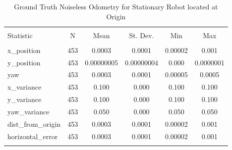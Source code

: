 
\begin{table}[h] \centering 
  \caption{Ground Truth Noiseless Odometry for Stationary Robot located at Origin} 
  \label{tab:gazebo_stationary_noiseless_summary} 
\begin{tabular}{@{\extracolsep{5pt}}lccccc} 
\\[-1.8ex]\hline 
\hline \\[-1.8ex] 
Statistic & \multicolumn{1}{c}{N} & \multicolumn{1}{c}{Mean} & \multicolumn{1}{c}{St. Dev.} & \multicolumn{1}{c}{Min} & \multicolumn{1}{c}{Max} \\ 
\hline \\[-1.8ex] 
x\_position & 453 & \num{0.0003} & \num{0.0001} & \num{0.00002} & \num{0.001} \\ 
y\_position & 453 & \num{0.00000005} & \num{0.00000004} & \num{0.000} & \num{0.0000001} \\ 
yaw & 453 & \num{0.0003} & \num{0.0001} & \num{0.00005} & \num{0.0005} \\ 
x\_variance & 453 & \num{0.100} & \num{0.000} & \num{0.100} & \num{0.100} \\ 
y\_variance & 453 & \num{0.100} & \num{0.000} & \num{0.100} & \num{0.100} \\ 
yaw\_variance & 453 & \num{0.050} & \num{0.000} & \num{0.050} & \num{0.050} \\ 
dist\_from\_origin & 453 & \num{0.0003} & \num{0.0001} & \num{0.00002} & \num{0.001} \\ 
horizontal\_error & 453 & \num{0.0003} & \num{0.0001} & \num{0.00002} & \num{0.001} \\ 
\hline \\[-1.8ex] 
\end{tabular} 
\end{table} 
